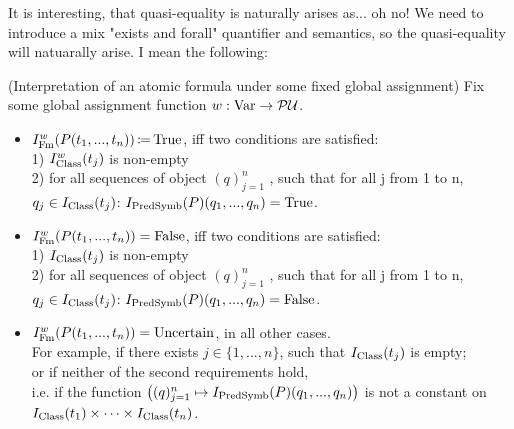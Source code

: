 It is interesting, that quasi-equality is naturally arises as... oh no!
We need to introduce a mix "exists and forall" quantifier and semantics, so the quasi-equality will natuarally arise.
I mean the following:


\begin{definition}(Interpretation of an atomic formula under some fixed global assignment)
Fix some global assignment function $w:\mathrm{Var}\to\mathcal{P}\mathcal{U}$.\\


\begin{itemize}
\item
$I_{\mathrm{Fm}}^w(P(t_1,...,t_n))\,{\coloneqq}\, \mathrm{True}$, iff two conditions are satisfied:\\
1) $I^w_{\text{Class}}(t_j)$ is non-empty\\
2) for all sequences of object $(q)_{j=1}^n$ , such that for all j from 1 to n, $q_j\in I_{\text{Class}}(t_j)$: $I_{\mathrm{PredSymb}}(P)(q_1,...,q_n)=\mathrm{True}$.
\item $I_{\mathrm{Fm}}^w(P(t_1,...,t_n))=\mathrm{False}$, iff two conditions are satisfied:\\
1) $I_{\text{Class}}(t_j)$ is non-empty\\
2) for all sequences of object $(q)_{j=1}^n$ , such that for all j from 1 to n, $q_j\in I_{\text{Class}}(t_j)$: $I_{\mathrm{PredSymb}}(P)(q_1,...,q_n)=\mathrm{False}$.
\item
$I_{\mathrm{Fm}}^w(P(t_1,...,t_n))=\mathrm{Uncertain}$, in all other cases.\\
For example, if there exists $j\in\{1,...,n\}$, such that $I_{\text{Class}}(t_j)$ is empty;\\
or if neither of the second requirements hold,\\
i.e. if the function $\left((q)_{j=1}^n \mapsto I_{\mathrm{PredSymb}}(P)(q_1,...,q_n)\right)$ is not a constant on $I_{\text{Class}}(t_1)\times\dots\times I_{\text{Class}}(t_n)$.
\end{itemize}
\end{definition}





